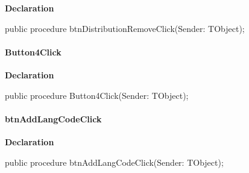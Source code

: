 \documentclass{report}
\newif\ifpdf
\begin{document}
\label{prjwizard.TfrmProjectWizard-btnDistributionRemoveClick}
\begin{list}{}{
\setlength{\itemindent}{0cm}
\setlength{\listparindent}{0cm}
\setlength{\leftmargin}{\evensidemargin}
\addtolength{\leftmargin}{\tmplength}
\settowidth{\labelsep}{X}
\addtolength{\leftmargin}{\labelsep}
\setlength{\labelwidth}{\tmplength}
}
\item[\textbf{Declaration}\hfill]
\ifpdf
\begin{flushleft}
\fi
\begin{ttfamily}
public procedure btnDistributionRemoveClick(Sender: TObject);\end{ttfamily}

\ifpdf
\end{flushleft}
\fi

\end{list}
\paragraph*{Button4Click}\hspace*{\fill}

\label{prjwizard.TfrmProjectWizard-Button4Click}
\begin{list}{}{
\setlength{\itemindent}{0cm}
\setlength{\listparindent}{0cm}
\setlength{\leftmargin}{\evensidemargin}
\addtolength{\leftmargin}{\tmplength}
\settowidth{\labelsep}{X}
\addtolength{\leftmargin}{\labelsep}
\setlength{\labelwidth}{\tmplength}
}
\item[\textbf{Declaration}\hfill]
\ifpdf
\begin{flushleft}
\fi
\begin{ttfamily}
public procedure Button4Click(Sender: TObject);\end{ttfamily}

\ifpdf
\end{flushleft}
\fi

\end{list}
\paragraph*{btnAddLangCodeClick}\hspace*{\fill}

\label{prjwizard.TfrmProjectWizard-btnAddLangCodeClick}
\begin{list}{}{
\setlength{\itemindent}{0cm}
\setlength{\listparindent}{0cm}
\setlength{\leftmargin}{\evensidemargin}
\addtolength{\leftmargin}{\tmplength}
\settowidth{\labelsep}{X}
\addtolength{\leftmargin}{\labelsep}
\setlength{\labelwidth}{\tmplength}
}
\item[\textbf{Declaration}\hfill]
\ifpdf
\begin{flushleft}
\fi
\begin{ttfamily}
public procedure btnAddLangCodeClick(Sender: TObject);\end{ttfamily}

\ifpdf
\end{flushleft}
\fi

\end{list}
\end{document}
